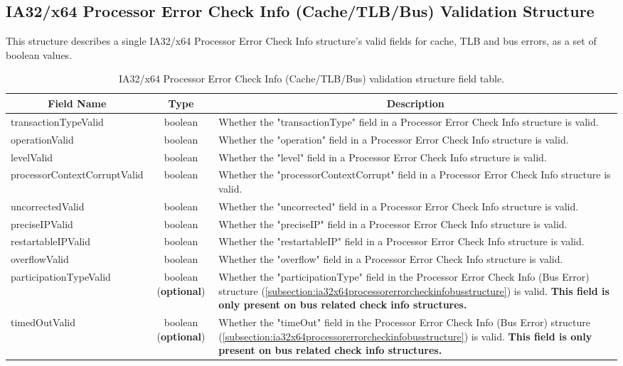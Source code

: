 \documentclass{report}
\newcommand*{\thead}[1]{\multicolumn{1}{|c|}{\bfseries #1}}
\newcommand*{\jsontable}[1]{
    \begin{table}[!ht]
    \label{#1}
    \centering
    \begin{adjustbox}{center}
    \begin{tabular}{|l|c|p{8cm}|}
    \hline
    \thead{Field Name} & \thead{Type} & \thead{Description} \\
    \hline
}
\newcommand*{\jsontableend}[1]{
    \hline
    \end{tabular}
    \end{adjustbox}
    \caption{#1}
    \label{table:#1}
    \end{table}
    \FloatBarrier
}
\begin{document}
\subsection{IA32/x64 Processor Error Check Info (Cache/TLB/Bus) Validation Structure}
\label{subsection:ia32x64processorerrorcheckinfovalidationstructure}
This structure describes a single IA32/x64 Processor Error Check Info structure's valid fields for cache, TLB and bus errors, as a set of boolean values.
\jsontable{table:ia32x64processorerrorcheckinfovalidationstructure}
transactionTypeValid & boolean & Whether the "transactionType" field in a Processor Error Check Info structure is valid.\\
\hline
operationValid & boolean & Whether the "operation" field in a Processor Error Check Info structure is valid.\\
\hline
levelValid & boolean & Whether the "level" field in a Processor Error Check Info structure is valid.\\
\hline
processorContextCorruptValid & boolean & Whether the "processorContextCorrupt" field in a Processor Error Check Info structure is valid.\\
\hline
uncorrectedValid & boolean & Whether the "uncorrected" field in a Processor Error Check Info structure is valid.\\
\hline
preciseIPValid & boolean & Whether the "preciseIP" field in a Processor Error Check Info structure is valid.\\
\hline
restartableIPValid & boolean & Whether the "restartableIP" field in a Processor Error Check Info structure is valid.\\
\hline
overflowValid & boolean & Whether the "overflow" field in a Processor Error Check Info structure is valid.\\
\hline
participationTypeValid & boolean (\textbf{optional}) & Whether the "participationType" field in the Processor Error Check Info (Bus Error) structure (\ref{subsection:ia32x64processorerrorcheckinfobusstructure}) is valid. \textbf{This field is only present on bus related check info structures.}\\
\hline
timedOutValid & boolean (\textbf{optional}) & Whether the "timeOut" field in the Processor Error Check Info (Bus Error) structure (\ref{subsection:ia32x64processorerrorcheckinfobusstructure}) is valid. \textbf{This field is only present on bus related check info structures.}\\
\jsontableend{IA32/x64 Processor Error Check Info (Cache/TLB/Bus) validation structure field table.}
\end{document}
